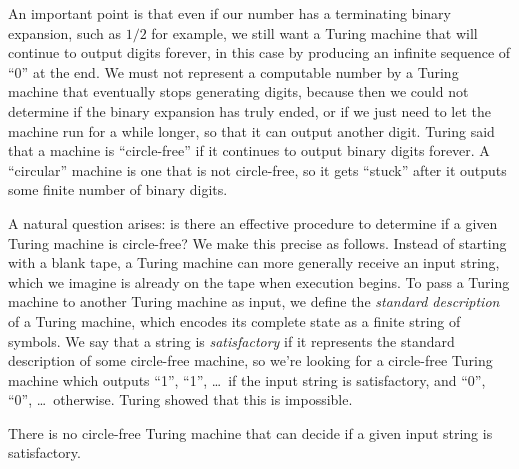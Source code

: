 \documentclass[../generics]{subfiles}
\begin{document}
An important point is that even if our number has a terminating binary expansion, such as $1/2$ for example, we still want a Turing machine that will continue to output digits forever, in this case by producing an infinite sequence of ``0'' at the end. We must not represent a computable number by a Turing machine that eventually stops generating digits, because then we could not determine if the binary expansion has truly ended, or if we just need to let the machine run for a while longer, so that it can output another digit. Turing said that a machine is ``circle-free'' if it continues to output binary digits forever. A ``circular'' machine is one that is not circle-free, so it gets ``stuck'' after it outputs some finite number of binary digits.

A natural question arises: is there an effective procedure to determine if a given Turing machine is circle-free? We make this precise as follows. Instead of starting with a blank tape, a Turing machine can more generally receive an input string, which we imagine is already on the tape when execution begins. To pass a Turing machine to another Turing machine as input, we define the \emph{standard description} of a Turing machine, which encodes its complete state as a finite string of symbols. We say that a string is \emph{satisfactory} if it represents the standard description of some circle-free machine, so we're looking for a circle-free Turing machine which outputs ``1'', ``1'', \ldots\ if the input string is satisfactory, and ``0'', ``0'', \ldots\ otherwise. Turing showed that this is impossible.
\begin{theorem}
There is no circle-free Turing machine that can decide if a given input string is satisfactory.
\end{theorem}
\end{document}
